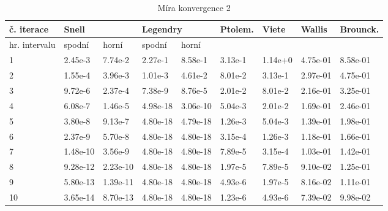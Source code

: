 \documentclass[soc]{gzwroc} %
\begin{document}
\begin{table}[h!]
\caption{Míra konvergence 2}
\begin{tabular}{|l|l|l|l|l|l|l|l|l|}
\hline
\multicolumn{1}{|l|}{\bfseries č. iterace} & \multicolumn{2}{l|}{\bfseries Snell} & \multicolumn{2}{l|}{\bfseries Legendry} & \multicolumn{1}{l|}{\bfseries Ptolem.} & \multicolumn{1}{l|}{\bfseries Viete} & \multicolumn{1}{l|}{\bfseries Wallis} & \multicolumn{1}{l|}{\bfseries Brounck.}  \\ \hline
\multicolumn{1}{|l|}{hr. intervalu} & \multicolumn{1}{l|}{spodní} & \multicolumn{1}{l|}{horní} & \multicolumn{1}{l|}{spodní} & \multicolumn{1}{l|}{horní} & \multicolumn{1}{l|}{} & \multicolumn{1}{l|}{} & \multicolumn{1}{l|}{} & \multicolumn{1}{l|}{} \\ \hline \hline
1 & 2.45e-3 & 7.74e-2 & 2.27e-1 & 8.58e-1 & 3.13e-1 & 1.14e+0 & 4.75e-01 & 8.58e-01 \\ \hline 
2 & 1.55e-4 & 3.96e-3 & 1.01e-3 & 4.61e-2 & 8.01e-2 & 3.13e-1 & 2.97e-01 & 4.75e-01 \\ \hline 
3 & 9.72e-6 & 2.37e-4 & 7.38e-9 & 8.76e-5 & 2.01e-2 & 8.01e-2 & 2.16e-01 & 3.25e-01 \\ \hline 
4 & 6.08e-7 & 1.46e-5 & 4.98e-18 & 3.06e-10 & 5.04e-3 & 2.01e-2 & 1.69e-01 & 2.46e-01 \\ \hline 
5 & 3.80e-8 & 9.13e-7 & 4.80e-18 & 4.79e-18 & 1.26e-3 & 5.04e-3 & 1.39e-01 & 1.98e-01 \\ \hline 
6 & 2.37e-9 & 5.70e-8 & 4.80e-18 & 4.80e-18 & 3.15e-4 & 1.26e-3 & 1.18e-01 & 1.66e-01 \\ \hline 
7 & 1.48e-10 & 3.56e-9 & 4.80e-18 & 4.80e-18 & 7.89e-5 & 3.15e-4 & 1.03e-01 & 1.42e-01 \\ \hline 
8 & 9.28e-12 & 2.23e-10 & 4.80e-18 & 4.80e-18 & 1.97e-5 & 7.89e-5 & 9.10e-02 & 1.25e-01 \\ \hline 
9 & 5.80e-13 & 1.39e-11 & 4.80e-18 & 4.80e-18 & 4.93e-6 & 1.97e-5 & 8.16e-02 & 1.11e-01 \\ \hline 
10 & 3.65e-14 & 8.70e-13 & 4.80e-18 & 4.80e-18 & 1.23e-6 & 4.93e-6 & 7.39e-02 & 9.98e-02 \\ \hline 
\end{tabular}
\end{table}
\end{document}

